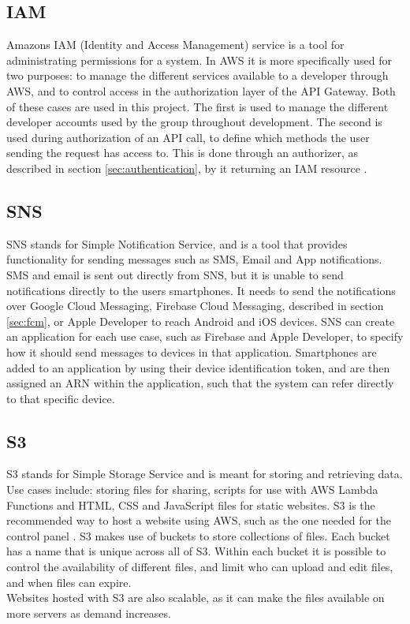 \subsection{IAM}\label{sec:iam}
Amazons IAM (Identity and Access Management) service is a tool for administrating permissions for a system. In AWS it is more specifically used for two purposes: to manage the different services available to a developer through AWS, and to control access in the authorization layer of the API Gateway. Both of these cases are used in this project. The first is used to manage the different developer accounts used by the group throughout development. The second is used during authorization of an API call, to define which methods the user sending the request has access to. This is done through an authorizer, as described in section \ref{sec:authentication}, by it returning an IAM resource \cite{aws:iamres}.


\subsection{SNS}\label{sns_service}
SNS stands for Simple Notification Service, and is a tool that provides functionality for sending messages such as SMS, Email and App notifications. SMS and email is sent out directly from SNS, but it is unable to send notifications directly to the users smartphones. It needs to send the notifications over Google Cloud Messaging, Firebase Cloud Messaging, described in section \ref{sec:fcm}, or Apple Developer to reach Android and iOS devices.
SNS can create an application for each use case, such as Firebase and Apple Developer, to specify how it should send messages to devices in that application. Smartphones are added to an application by using their device identification token, and are then assigned an ARN within the application, such that the system can refer directly to that specific device.

\subsection{S3} \label{s3}
S3 stands for Simple Storage Service and is meant for storing and retrieving data. Use cases include: storing files for sharing, scripts for use with AWS Lambda Functions and HTML, CSS and JavaScript files for static websites. S3 is the recommended way to host a website using AWS, such as the one needed for the control panel \cite{aws:webhosting}. S3 makes use of buckets to store collections of files. Each bucket has a name that is unique across all of S3. Within each bucket it is possible to control the availability of different files, and limit who can upload and edit files, and when files can expire.\\
Websites hosted with S3 are also scalable, as it can make the files available on more servers as demand increases.

